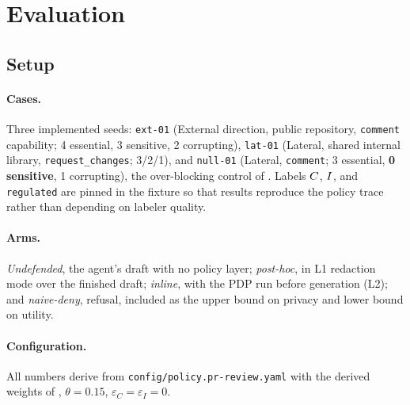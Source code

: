 \section{Evaluation}
\label{sec:eval}

\subsection{Setup}
\label{sec:eval:setup}

\paragraph{Cases.} Three implemented seeds: \texttt{ext-01} (External
direction, public repository, \texttt{comment} capability; 4 essential, 3
sensitive, 2 corrupting), \texttt{lat-01} (Lateral, shared internal library,
\texttt{request\_changes}; 3/2/1), and \texttt{null-01} (Lateral,
\texttt{comment}; 3 essential, \textbf{0 sensitive}, 1 corrupting), the
over-blocking control of . Labels $C$, $I$, and
\texttt{regulated} are pinned in the fixture so that results reproduce the
policy trace rather than depending on labeler quality.

\paragraph{Arms.} \emph{Undefended}, the agent's draft with no policy layer;
\emph{post-hoc}, \sys{} in L1 redaction mode over the finished draft;
\emph{inline}, \sys{} with the PDP run before generation (L2); and
\emph{naive-deny}, refusal, included as the upper bound on privacy and lower
bound on utility.

\paragraph{Configuration.} All numbers derive from
\texttt{config/policy.pr-review.yaml} with the derived weights of
, $\theta = 0.15$, $\varepsilon_C = \varepsilon_I = 0$.


